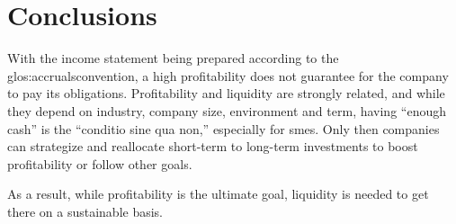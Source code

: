 
\section{Conclusions} \label{sec:Conclusions}
With the income statement being prepared according to the
\gls{glos:accrualsconvention}, a high profitability does not guarantee for the
company to pay its obligations.
Profitability and liquidity are strongly related, and while
they depend on industry, company size, environment and term, having ``enough
cash'' is  the ``conditio sine qua non,'' especially for \glspl{sme}. Only then
companies can strategize and reallocate
 short-term to long-term investments to boost profitability or follow other
 goals.

As a result, while profitability is the ultimate goal, liquidity is needed to
get there on a sustainable basis.
















